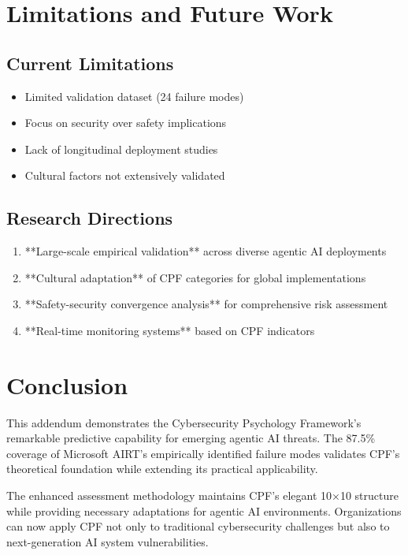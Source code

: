 \documentclass[11pt,a4paper]{article}
\begin{document}
\section{Limitations and Future Work}

\subsection{Current Limitations}

\begin{itemize}
\item Limited validation dataset (24 failure modes)
\item Focus on security over safety implications
\item Lack of longitudinal deployment studies
\item Cultural factors not extensively validated
\end{itemize}

\subsection{Research Directions}

\begin{enumerate}
\item **Large-scale empirical validation** across diverse agentic AI deployments
\item **Cultural adaptation** of CPF categories for global implementations
\item **Safety-security convergence analysis** for comprehensive risk assessment
\item **Real-time monitoring systems** based on CPF indicators
\end{enumerate}

\section{Conclusion}

This addendum demonstrates the Cybersecurity Psychology Framework's remarkable predictive capability for emerging agentic AI threats. The 87.5\% coverage of Microsoft AIRT's empirically identified failure modes validates CPF's theoretical foundation while extending its practical applicability.

The enhanced assessment methodology maintains CPF's elegant 10×10 structure while providing necessary adaptations for agentic AI environments. Organizations can now apply CPF not only to traditional cybersecurity challenges but also to next-generation AI system vulnerabilities.
\end{document}
